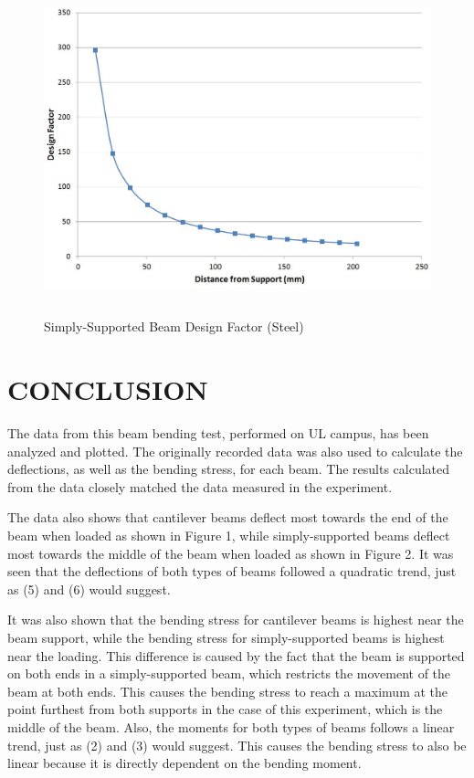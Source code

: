 \documentclass[12pt]{article}
\begin{document}
\bigskip

\begin{figure}[h!]  
  \centering
    \includegraphics[width=\linewidth, height=3.8in]{ss_s_df.JPG}
    \caption{Simply-Supported Beam Design Factor (Steel)} 
\end{figure}

\newpage


\section*{\fontsize{12}{12}\selectfont CONCLUSION}
The data from this beam bending test, performed on UL campus, has been analyzed and plotted. The originally recorded data was also used to calculate the deflections, as well as the bending stress, for each beam. The results calculated from the data closely matched the data measured in the experiment. 
\bigskip

The data also shows that cantilever beams deflect most towards the end of the beam when loaded as shown in Figure 1, while simply-supported beams deflect most towards the middle of the beam when loaded as shown in Figure 2. It was seen that the deflections of both types of beams followed a quadratic trend, just as (5) and (6) would suggest.
\bigskip

It was also shown that the bending stress for cantilever beams is highest near the beam support, while the bending stress for simply-supported beams is highest near the loading. This difference is caused by the fact that the beam is supported on both ends in a simply-supported beam, which restricts the movement of the beam at both ends. This causes the bending stress to reach a maximum at the point furthest from both supports in the case of this experiment, which is the middle of the beam. Also, the moments for both types of beams follows a linear trend, just as (2) and (3) would suggest. This causes the bending stress to also be linear because it is directly dependent on the bending moment.
\bigskip
\end{document}
